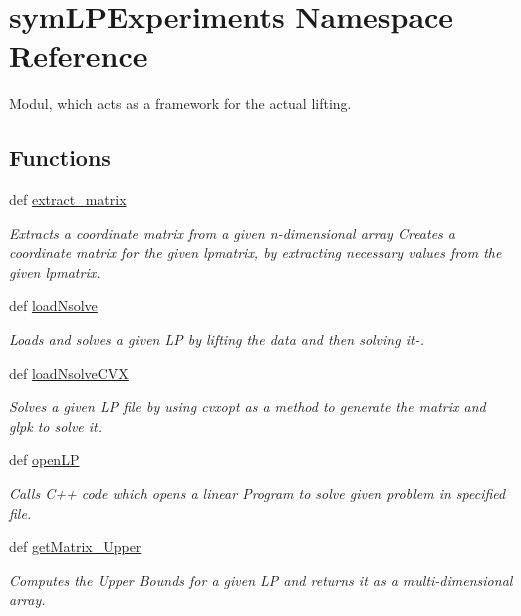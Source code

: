 \hypertarget{namespacesymLPExperiments}{\section{sym\-L\-P\-Experiments Namespace Reference}
\label{namespacesymLPExperiments}
}


Modul, which acts as a framework for the actual lifting.  


\subsection*{Functions}
\begin{DoxyCompactItemize}
\item 
def \hyperlink{namespacesymLPExperiments_a00f49f67a2a2d9e675d6f392a28c6d21}{extract\-\_\-matrix}
\begin{DoxyCompactList}\small\item\em Extracts a coordinate matrix from a given n-\/dimensional array Creates a coordinate matrix for the given lpmatrix, by extracting necessary values from the given lpmatrix. \end{DoxyCompactList}\item 
def \hyperlink{namespacesymLPExperiments_a13db8437b54c2d6e412fdca6beebcd73}{load\-Nsolve}
\begin{DoxyCompactList}\small\item\em Loads and solves a given L\-P by lifting the data and then solving it-\/. \end{DoxyCompactList}\item 
def \hyperlink{namespacesymLPExperiments_aac02ec1af252db0b5351036a4725aa22}{load\-Nsolve\-C\-V\-X}
\begin{DoxyCompactList}\small\item\em Solves a given L\-P file by using cvxopt as a method to generate the matrix and glpk to solve it. \end{DoxyCompactList}\item 
def \hyperlink{namespacesymLPExperiments_afa34014b1f1672e7afeb43b92ef3a772}{open\-L\-P}
\begin{DoxyCompactList}\small\item\em Calls C++ code which opens a linear Program to solve given problem in specified file. \end{DoxyCompactList}\item 
def \hyperlink{namespacesymLPExperiments_a93c8ed89eba71dcb13d4b0096f20367f}{get\-Matrix\-\_\-\-Upper}
\begin{DoxyCompactList}\small\item\em Computes the Upper Bounds for a given L\-P and returns it as a multi-\/dimensional array. \end{DoxyCompactList}\item 

\end{DoxyCompactItemize}
